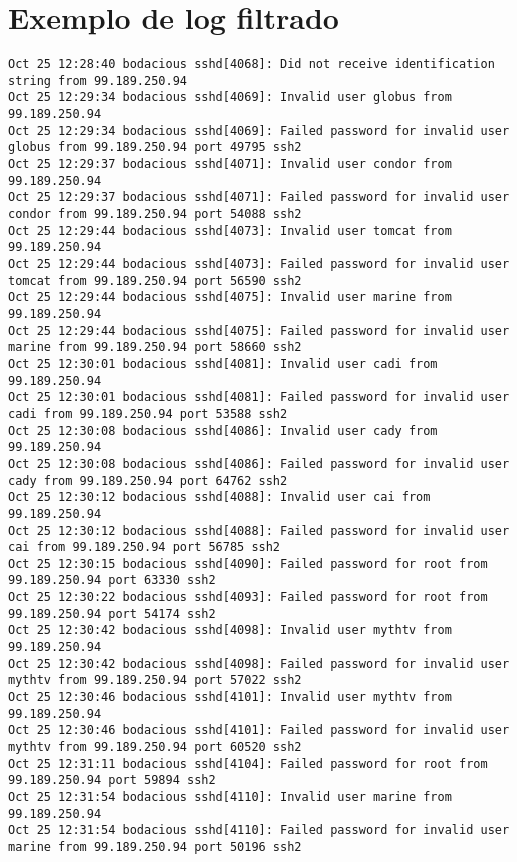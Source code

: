\chapter{Exemplo de log filtrado}
\label{anexo:log_filtrado}

\scriptsize
\begin{verbatim}
Oct 25 12:28:40 bodacious sshd[4068]: Did not receive identification string from 99.189.250.94
Oct 25 12:29:34 bodacious sshd[4069]: Invalid user globus from 99.189.250.94
Oct 25 12:29:34 bodacious sshd[4069]: Failed password for invalid user globus from 99.189.250.94 port 49795 ssh2
Oct 25 12:29:37 bodacious sshd[4071]: Invalid user condor from 99.189.250.94
Oct 25 12:29:37 bodacious sshd[4071]: Failed password for invalid user condor from 99.189.250.94 port 54088 ssh2
Oct 25 12:29:44 bodacious sshd[4073]: Invalid user tomcat from 99.189.250.94
Oct 25 12:29:44 bodacious sshd[4073]: Failed password for invalid user tomcat from 99.189.250.94 port 56590 ssh2
Oct 25 12:29:44 bodacious sshd[4075]: Invalid user marine from 99.189.250.94
Oct 25 12:29:44 bodacious sshd[4075]: Failed password for invalid user marine from 99.189.250.94 port 58660 ssh2
Oct 25 12:30:01 bodacious sshd[4081]: Invalid user cadi from 99.189.250.94
Oct 25 12:30:01 bodacious sshd[4081]: Failed password for invalid user cadi from 99.189.250.94 port 53588 ssh2
Oct 25 12:30:08 bodacious sshd[4086]: Invalid user cady from 99.189.250.94
Oct 25 12:30:08 bodacious sshd[4086]: Failed password for invalid user cady from 99.189.250.94 port 64762 ssh2
Oct 25 12:30:12 bodacious sshd[4088]: Invalid user cai from 99.189.250.94
Oct 25 12:30:12 bodacious sshd[4088]: Failed password for invalid user cai from 99.189.250.94 port 56785 ssh2
Oct 25 12:30:15 bodacious sshd[4090]: Failed password for root from 99.189.250.94 port 63330 ssh2
Oct 25 12:30:22 bodacious sshd[4093]: Failed password for root from 99.189.250.94 port 54174 ssh2
Oct 25 12:30:42 bodacious sshd[4098]: Invalid user mythtv from 99.189.250.94
Oct 25 12:30:42 bodacious sshd[4098]: Failed password for invalid user mythtv from 99.189.250.94 port 57022 ssh2
Oct 25 12:30:46 bodacious sshd[4101]: Invalid user mythtv from 99.189.250.94
Oct 25 12:30:46 bodacious sshd[4101]: Failed password for invalid user mythtv from 99.189.250.94 port 60520 ssh2
Oct 25 12:31:11 bodacious sshd[4104]: Failed password for root from 99.189.250.94 port 59894 ssh2
Oct 25 12:31:54 bodacious sshd[4110]: Invalid user marine from 99.189.250.94
Oct 25 12:31:54 bodacious sshd[4110]: Failed password for invalid user marine from 99.189.250.94 port 50196 ssh2

\end{verbatim}
